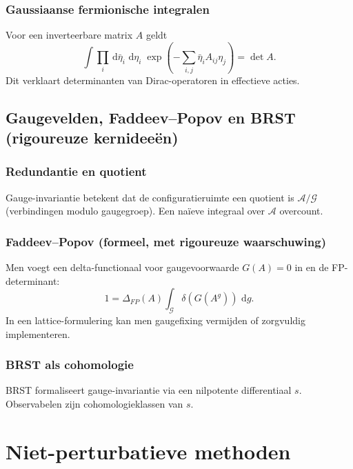 \documentclass[11pt,a4paper,oneside]{book}
\theoremstyle{plain}
\theoremstyle{definition}
\renewcommand{\dd}{\,\mathrm{d}}
\newcommand{\cA}{\mathcal{A}}
\newcommand{\cG}{\mathcal{G}}
\begin{document}
	\section{Gaussiaanse fermionische integralen}
	Voor een inverteerbare matrix $A$ geldt
	\[
	\int \prod_i \dd\bar\eta_i\,\dd\eta_i\;
	\exp\left(-\sum_{i,j}\bar\eta_i A_{ij}\eta_j\right)
	= \det A.
	\]
	Dit verklaart determinanten van Dirac-operatoren in effectieve acties.
	
	\chapter{Gaugevelden, Faddeev--Popov en BRST (rigoureuze kernideeën)}
	
	\section{Redundantie en quotient}
	Gauge-invariantie betekent dat de configuratieruimte een quotient is $\cA/\cG$ (verbindingen modulo gaugegroep).
	Een naïeve integraal over $\cA$ overcount.
	
	\section{Faddeev--Popov (formeel, met rigoureuze waarschuwing)}
	Men voegt een delta-functionaal voor gaugevoorwaarde $G(A)=0$ in en de FP-determinant:
	\[
	1 = \Delta_{FP}(A)\int_{\cG}\delta(G(A^g))\,\dd g.
	\]
	In een lattice-formulering kan men gaugefixing vermijden of zorgvuldig implementeren.
	
	\section{BRST als cohomologie}
	BRST formaliseert gauge-invariantie via een nilpotente differentiaal $s$.
	Observabelen zijn cohomologieklassen van $s$.
	
	\part{Niet-perturbatieve methoden}
	
\end{document}
